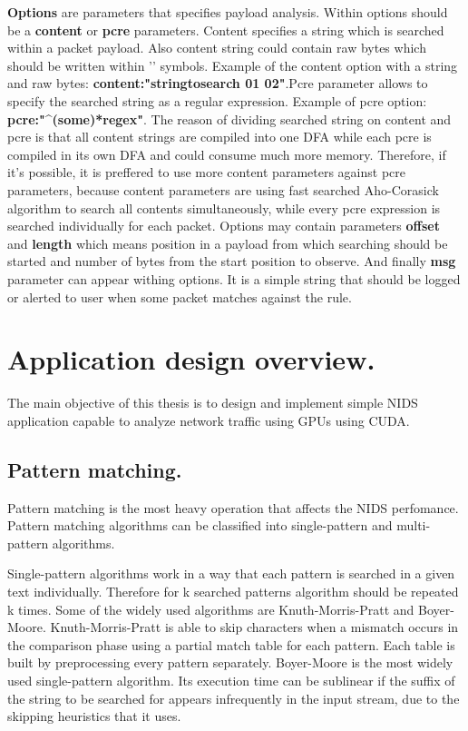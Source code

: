 \documentclass[thesis=M,english]{FITthesis}[2011/07/15]
\begin{document}
\textbf{Options} are parameters that specifies payload analysis. Within options should be a \textbf{content} or \textbf{pcre} parameters. Content specifies a string which is searched within a packet payload. Also content string could contain raw bytes which should be written within '\textbar' symbols. Example of the content option with a string and raw bytes: \textbf{content:"stringtosearch 01 02\textbar"}.\newline Pcre parameter allows to specify the searched string as a regular expression. Example of pcre option: \textbf{pcre:"\textasciicircum(some)*regex"}. The reason of dividing searched string on content and pcre is that all content strings are compiled into one DFA while each pcre is compiled in its own DFA and could consume much more memory. Therefore, if it's possible, it is preffered to use more content parameters against pcre parameters, because content parameters are using fast searched Aho-Corasick algorithm to search all contents simultaneously, while every pcre expression is searched individually for each packet. Options may contain parameters \textbf{offset} and \textbf{length} which means position in a payload from which searching should be started and number of bytes from the start position to observe. And finally \textbf{msg} parameter can appear withing options. It is a simple string that should be logged or alerted to user when some packet matches against the rule.

\section{Application design overview.}
The main objective of this thesis is to design and implement simple NIDS application capable to analyze network traffic using GPUs using CUDA. 
\subsection*{Pattern matching.}
Pattern matching is the most heavy operation that affects the NIDS perfomance. Pattern matching algorithms can be classified into single-pattern and multi-pattern algorithms.

Single-pattern algorithms work in a way that each pattern is searched in a given text individually. Therefore for k searched patterns algorithm should be repeated k times. Some of the widely used algorithms are Knuth-Morris-Pratt and Boyer-Moore. Knuth-Morris-Pratt is able to skip characters when a mismatch occurs in the comparison phase using a partial match table for each pattern. Each table is built by preprocessing every pattern separately. Boyer-Moore is the most widely used single-pattern algorithm. Its execution time can be sublinear if the suffix of the string to be searched for appears infrequently in the input stream, due to the skipping heuristics that it uses.
\end{document}
